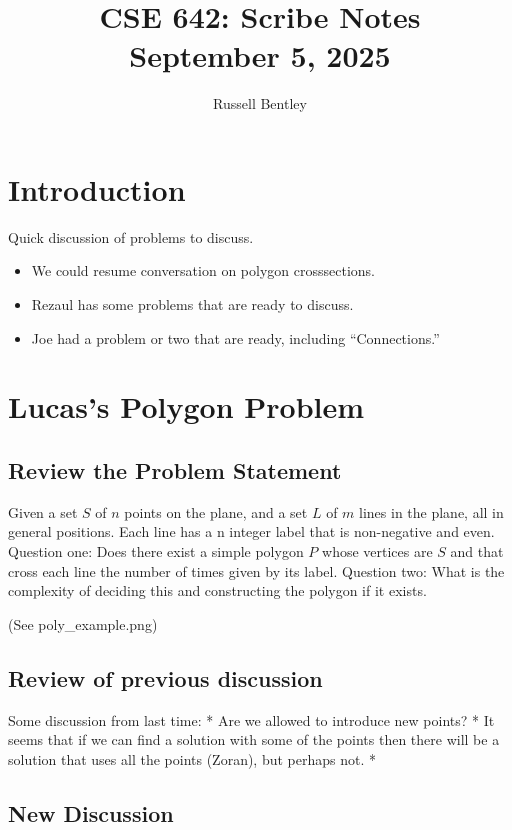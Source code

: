 \documentclass{article}
\title{CSE 642: Scribe Notes \\ September 5, 2025}
\author{Russell Bentley}
\begin{document}
\maketitle

\section{Introduction}

Quick discussion of problems to discuss. 
\begin{itemize}
\item We could resume conversation on polygon crosssections.
\item Rezaul has some problems that are ready to discuss.
\item Joe had a problem or two that are ready, including ``Connections.''
\end{itemize}

\section{Lucas's Polygon Problem}

\subsection{Review the Problem Statement}

Given a set $S$ of $n$ points on the plane, and a set $L$ of $m$ lines in the plane, all in general positions.
Each line has a n integer label that is non-negative and even.
Question one: Does there exist a simple polygon $P$ whose vertices are $S$ and that cross each line the number of times given by its label.
Question two: What is the complexity of deciding this and constructing the polygon if it exists.

(See poly_example.png)

\subsection{Review of previous discussion}

Some discussion from last time:
* Are we allowed to introduce new points?
* It seems that if we can find a solution with some of the points then there will be a solution that uses all the points (Zoran), but perhaps not.
* 

\subsection{New Discussion}
\end{document}
